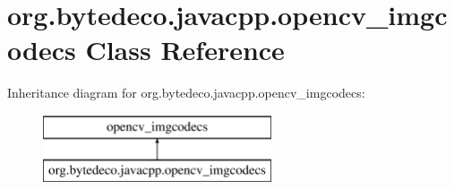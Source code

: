 \hypertarget{classorg_1_1bytedeco_1_1javacpp_1_1opencv__imgcodecs}{}\section{org.\+bytedeco.\+javacpp.\+opencv\+\_\+imgcodecs Class Reference}
\label{classorg_1_1bytedeco_1_1javacpp_1_1opencv__imgcodecs}
Inheritance diagram for org.\+bytedeco.\+javacpp.\+opencv\+\_\+imgcodecs\+:\begin{figure}[H]
\begin{center}
\leavevmode
\includegraphics[height=2.000000cm]{classorg_1_1bytedeco_1_1javacpp_1_1opencv__imgcodecs}
\end{center}
\end{figure}
